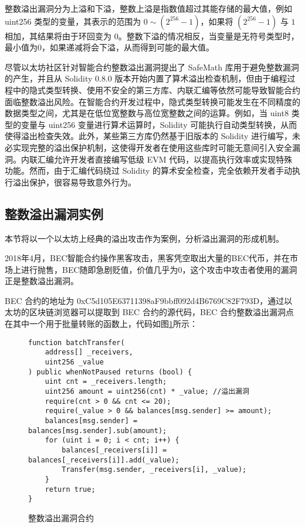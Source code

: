 \documentclass[print, master, vlined, timesmath]{DissertUESTC}
\begin{document}
整数溢出漏洞分为上溢和下溢，整数上溢是指数值超过其能存储的最大值，例如 uint256 类型的变量，其表示的范围为 \(0\sim (2^{256}-1)\)，如果将 \((2^{256}-1)\) 与 \(1\) 相加，其结果将由于环回变为 \(0\)。整数下溢的情况相反，当变量是无符号类型时，最小值为0，如果递减将会下溢，从而得到可能的最大值。

尽管以太坊社区针对智能合约整数溢出漏洞提出了 SafeMath 库用于避免整数漏洞的产生，并且从 Solidity 0.8.0 版本开始内置了算术溢出检查机制，但由于编程过程中的隐式类型转换、使用不安全的第三方库、内联汇编等依然可能导致智能合约面临整数溢出风险。在智能合约开发过程中，隐式类型转换可能发生在不同精度的数据类型之间，尤其是在低位宽整数与高位宽整数之间的运算。例如，当 uint8 类型的变量与 uint256 变量进行算术运算时，Solidity 可能执行自动类型转换，从而使得溢出检查失效。此外，某些第三方库仍然基于旧版本的 Solidity 进行编写，未必实现完整的溢出保护机制，这使得开发者在使用这些库时可能无意间引入安全漏洞。内联汇编允许开发者直接编写低级 EVM 代码，以提高执行效率或实现特殊功能。然而，由于汇编代码绕过 Solidity 的算术安全检查，完全依赖开发者手动执行溢出保护，很容易导致意外行为。
    
    

\subsection{整数溢出漏洞实例}


本节将以一个以太坊上经典的溢出攻击作为案例，分析溢出漏洞的形成机制。

2018年4月，BEC智能合约操作黑客攻击，黑客凭空取出大量的BEC代币，并在市场上进行抛售，BEC随即急剧贬值，价值几乎为0\cite{}，这个攻击中攻击者使用的漏洞正是整数溢出漏洞。

BEC 合约的地址为 0xC5d105E63711398aF9bbff092d4B6769C82F793D，通过以太坊的区块链浏览器可以提取到 BEC 合约的源代码，BEC 合约整数溢出漏洞点在其中一个用于批量转账的函数上，代码如图\ref{fig:整数溢出漏洞合约}所示：


\begin{figure}[H]
    \centering
    \begin{minipage}{0.9\textwidth}
    \begin{verbatim}
function batchTransfer(
    address[] _receivers, 
    uint256 _value
) public whenNotPaused returns (bool) {
    uint cnt = _receivers.length;
    uint256 amount = uint256(cnt) * _value; //溢出漏洞
    require(cnt > 0 && cnt <= 20);
    require(_value > 0 && balances[msg.sender] >= amount);
    balances[msg.sender] = balances[msg.sender].sub(amount);
    for (uint i = 0; i < cnt; i++) {
        balances[_receivers[i]] = balances[_receivers[i]].add(_value);
        Transfer(msg.sender, _receivers[i], _value);
    }
    return true;
}
    \end{verbatim}
    \end{minipage}
    \caption{整数溢出漏洞合约}
    \label{fig:整数溢出漏洞合约}
\end{figure}
\end{document}
